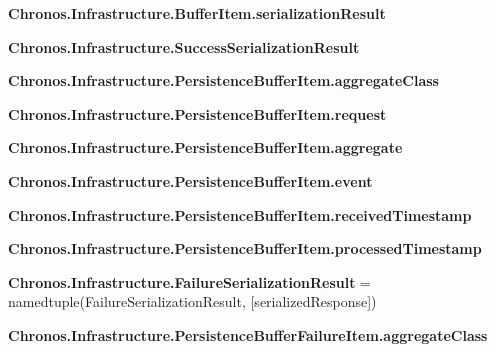 \begin{DoxyCompactItemize}
\item 
{\bfseries Chronos.\+Infrastructure.\+Buffer\+Item.\+serialization\+Result}\hypertarget{group__Chronos_gaa69d36f0ce649a030a82e0a0f1c94c7c}{}\label{group__Chronos_gaa69d36f0ce649a030a82e0a0f1c94c7c}

\item 
{\bfseries Chronos.\+Infrastructure.\+Success\+Serialization\+Result}
\item 
{\bfseries Chronos.\+Infrastructure.\+Persistence\+Buffer\+Item.\+aggregate\+Class}\hypertarget{group__Chronos_ga6d9c04de79a8375d71e7bd1472c4b2a5}{}\label{group__Chronos_ga6d9c04de79a8375d71e7bd1472c4b2a5}

\item 
{\bfseries Chronos.\+Infrastructure.\+Persistence\+Buffer\+Item.\+request}\hypertarget{group__Chronos_ga8a2b179f9dc0e4fe3bb2c1555a67c24b}{}\label{group__Chronos_ga8a2b179f9dc0e4fe3bb2c1555a67c24b}

\item 
{\bfseries Chronos.\+Infrastructure.\+Persistence\+Buffer\+Item.\+aggregate}\hypertarget{group__Chronos_ga298162ea97a4f63c503ae7c228e9b638}{}\label{group__Chronos_ga298162ea97a4f63c503ae7c228e9b638}

\item 
{\bfseries Chronos.\+Infrastructure.\+Persistence\+Buffer\+Item.\+event}\hypertarget{group__Chronos_ga1189b19ec7a2d9fe941fd5c5d4a9baf4}{}\label{group__Chronos_ga1189b19ec7a2d9fe941fd5c5d4a9baf4}

\item 
{\bfseries Chronos.\+Infrastructure.\+Persistence\+Buffer\+Item.\+received\+Timestamp}\hypertarget{group__Chronos_ga7c8f25d7ddece64824c7a5dad01a0ffe}{}\label{group__Chronos_ga7c8f25d7ddece64824c7a5dad01a0ffe}

\item 
{\bfseries Chronos.\+Infrastructure.\+Persistence\+Buffer\+Item.\+processed\+Timestamp}\hypertarget{group__Chronos_ga5a81922b2a38328f4130efb8ff7be550}{}\label{group__Chronos_ga5a81922b2a38328f4130efb8ff7be550}

\item 
{\bfseries Chronos.\+Infrastructure.\+Failure\+Serialization\+Result} = namedtuple(\textquotesingle{}Failure\+Serialization\+Result\textquotesingle{}, \mbox{[}\textquotesingle{}serialized\+Response\textquotesingle{}\mbox{]})\hypertarget{group__Chronos_ga50a9dc10895456e0a8ed2cb31794e53a}{}\label{group__Chronos_ga50a9dc10895456e0a8ed2cb31794e53a}

\item 
{\bfseries Chronos.\+Infrastructure.\+Persistence\+Buffer\+Failure\+Item.\+aggregate\+Class}\hypertarget{group__Chronos_gac37fe58d45cafb0c6c8c286e6c5369f6}{}\label{group__Chronos_gac37fe58d45cafb0c6c8c286e6c5369f6}


\end{DoxyCompactItemize}
